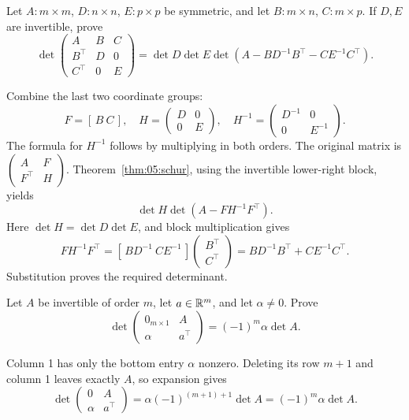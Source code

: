 \begin{problem}\label{ex:05:three-blocks}
Let \(A:m\times m\), \(D:n\times n\), \(E:p\times p\) be symmetric,
and let \(B:m\times n\), \(C:m\times p\). If \(D,E\) are invertible, prove
\[
\det\begin{pmatrix}A&B&C\\B^\top&D&0\\C^\top&0&E\end{pmatrix}
=\det D\det E\det(A-BD^{-1}B^\top-CE^{-1}C^\top).
\]
\end{problem}
\begin{solution}
Combine the last two coordinate groups:
\[
F=[\,B\ C\,],\quad H=\begin{pmatrix}D&0\\0&E\end{pmatrix},\quad
H^{-1}=\begin{pmatrix}D^{-1}&0\\0&E^{-1}\end{pmatrix}.
\]
The formula for \(H^{-1}\) follows by multiplying in both orders.
The original matrix is \(\begin{pmatrix}A&F\\F^\top&H\end{pmatrix}\).
Theorem~\ref{thm:05:schur}, using the invertible lower-right block, yields
\[
\det H\det(A-FH^{-1}F^\top).
\]
Here \(\det H=\det D\det E\), and block multiplication gives
\[
FH^{-1}F^\top
=[\,BD^{-1}\ CE^{-1}\,]\begin{pmatrix}B^\top\\C^\top\end{pmatrix}
=BD^{-1}B^\top+CE^{-1}C^\top.
\]
Substitution proves the required determinant.
\end{solution}

\begin{problem}\label{ex:05:corner-scalar}
Let \(A\) be invertible of order \(m\), let \(a\in\mathbb R^m\), and let
\(\alpha\ne0\). Prove
\[
\det\begin{pmatrix}0_{m\times1}&A\\\alpha&a^\top\end{pmatrix}
=(-1)^m\alpha\det A.
\]
\end{problem}
\begin{solution}
Column 1 has only the bottom entry \(\alpha\) nonzero. Deleting its
row \(m+1\) and column 1 leaves exactly \(A\), so expansion gives
\[
\det\begin{pmatrix}0&A\\\alpha&a^\top\end{pmatrix}
=\alpha(-1)^{(m+1)+1}\det A=(-1)^m\alpha\det A.
\]
\end{solution}

